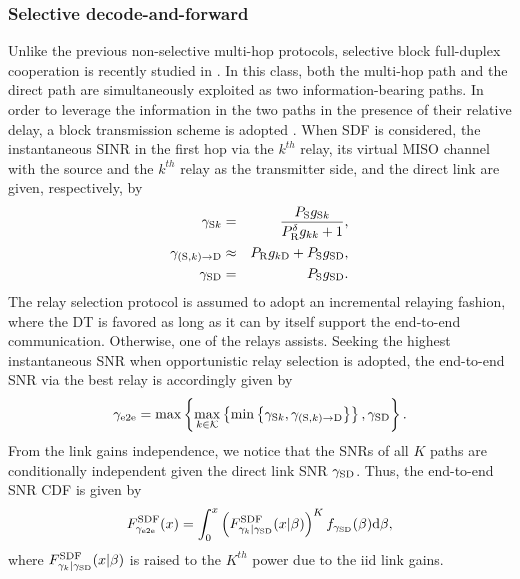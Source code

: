\documentclass[10pt,journal]{IEEEtran}
\begin{document}
\subsubsection{Selective decode-and-forward}
Unlike the previous non-selective multi-hop protocols, selective block full-duplex cooperation is recently studied in \cite{6510556,2015XX_TWC_Khafagy_FDR}. In this class, both the multi-hop path and the direct path are simultaneously exploited as two information-bearing paths. In order to leverage the information in the two paths in the presence of their relative delay, a block transmission scheme is adopted \cite{6510556}. When \ac{SDF} is considered, the instantaneous \ac{SINR} in the first hop via the $k^{th}$ relay, its virtual \ac{MISO} channel with the source and the $k^{th}$ relay as the transmitter side, and the direct link are given, respectively, by
\begin{eqnarray}
\gamma_{{\rm S} k}				&=&	\frac{P_{{\rm S}}g_{{\rm S} k}}{P_{{\rm R}}^\delta g_{kk}+1},\\
\gamma_{({\rm S}, k)\rightarrow {\rm D}} 				&\approx&	P_{{\rm R}}g_{k {\rm D}}+P_{{\rm S}}g_{{\rm S} {\rm D}},\\
\gamma_{{\rm S} {\rm D}}				&=&	P_{{\rm S}}g_{{\rm S} {\rm D}}.
\end{eqnarray}
The relay selection protocol is assumed to adopt an incremental relaying fashion, where the \ac{DT} is favored as long as it can by itself support the end-to-end communication. Otherwise, one of the relays assists. Seeking the highest instantaneous \ac{SNR} when opportunistic relay selection is adopted, the end-to-end \ac{SNR} via the best relay is accordingly given by
\begin{eqnarray}
\gamma_{\rm e2e} = \max\left\{\max_{k\in {\mathcal{K}}}\left\{\min\left\{\gamma_{{\rm S} k}	,\gamma_{({\rm S}, k)\rightarrow {\rm D}}\right\}\right\},\gamma_{{\rm S} {\rm D}}\right\}.
\end{eqnarray}
From the link gains independence, we notice that the \acp{SNR} of all $K$ paths are conditionally independent given the direct link \ac{SNR} $\gamma_{{\rm S} {\rm D}}$. Thus, the end-to-end \ac{SNR} \ac{CDF} is given by
\begin{eqnarray}
F_{\gamma_{\rm e2e}}^{\rm SDF}(x)=\int_0^x \left(F_{\gamma_{k} \vert \gamma_{{\rm S} {\rm D}}}^{\rm SDF}(x \vert \beta)\right)^K f_{\gamma_{{\rm S} {\rm D}}}(\beta)\mathrm{d}\beta,
\end{eqnarray}
where $F_{\gamma_{k} \vert \gamma_{{\rm S} {\rm D}}}^{\rm SDF}(x \vert \beta)$ is raised to the $K^{th}$ power due to the \ac{iid} link gains.
\end{document}
